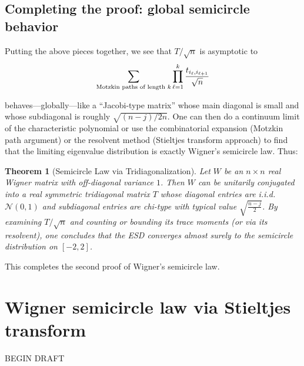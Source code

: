 \documentclass[letterpaper,11pt,oneside,reqno]{article}
\numberwithin{equation}{section}
\newtheorem{theorem}[proposition]{Theorem}
\theoremstyle{definition}
\begin{document}
\subsection{Completing the proof: global semicircle behavior}

Putting the above pieces together, we see that $T/\sqrt{n}$
is asymptotic to
\begin{equation*}
	\sum_{\textnormal{Motzkin\ paths
	of length\ $k$}}
	\prod_{\ell=1}^k
		\frac
	{t_{i_\ell,i_{\ell+1}}}{\sqrt{n}}
\end{equation*}




behaves—globally—like a “Jacobi-type matrix” whose main diagonal is small and whose subdiagonal is roughly $\sqrt{(n-j)/2n}$.  One can then do a continuum limit of the characteristic polynomial or use the combinatorial expansion (Motzkin path argument) or the resolvent method (Stieltjes transform approach) to find that the limiting eigenvalue distribution is exactly Wigner’s semicircle law.  Thus:

\begin{theorem}[Semicircle Law via Tridiagonalization]
\label{thm:sc-via-tridiag}
Let $W$ be an $n\times n$ real Wigner matrix with off-diagonal variance $1$. Then $W$ can be unitarily conjugated into a real symmetric tridiagonal matrix $T$ whose diagonal entries are i.i.d.\ $\mathcal{N}(0,1)$ and subdiagonal entries are chi-type with typical value $\sqrt{\tfrac{n-j}{2}}$.  By examining $T/\sqrt{n}$ and counting or bounding its trace moments (or via its resolvent), one concludes that the ESD converges almost surely to the semicircle distribution on $[-2,2]$.
\end{theorem}

This completes the second proof of Wigner’s semicircle law.




\section{Wigner semicircle law via Stieltjes transform}






BEGIN DRAFT
\end{document}
